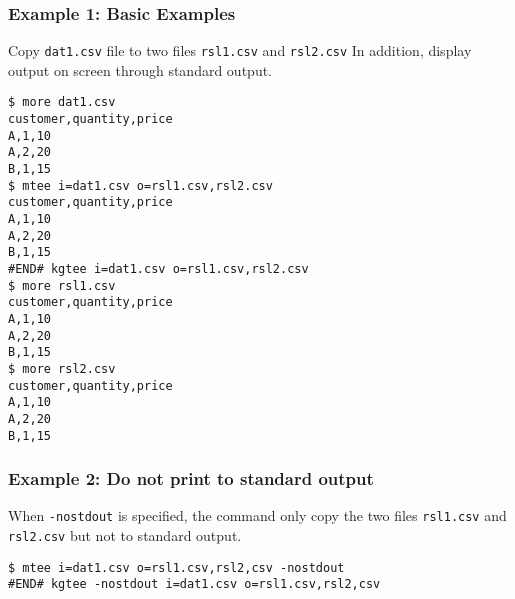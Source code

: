 \subsubsection*{Example 1: Basic Examples}

Copy \verb|dat1.csv| file to two files \verb|rsl1.csv| and \verb|rsl2.csv| In addition, display output on screen through standard output.


\begin{Verbatim}[baselinestretch=0.7,frame=single]
$ more dat1.csv
customer,quantity,price
A,1,10
A,2,20
B,1,15
$ mtee i=dat1.csv o=rsl1.csv,rsl2.csv
customer,quantity,price
A,1,10
A,2,20
B,1,15
#END# kgtee i=dat1.csv o=rsl1.csv,rsl2.csv
$ more rsl1.csv
customer,quantity,price
A,1,10
A,2,20
B,1,15
$ more rsl2.csv
customer,quantity,price
A,1,10
A,2,20
B,1,15
\end{Verbatim}
\subsubsection*{Example 2: Do not print to standard output }

When \verb|-nostdout| is specified, the command only copy the two files \verb|rsl1.csv| and \verb|rsl2.csv| but not to standard output.


\begin{Verbatim}[baselinestretch=0.7,frame=single]
$ mtee i=dat1.csv o=rsl1.csv,rsl2,csv -nostdout
#END# kgtee -nostdout i=dat1.csv o=rsl1.csv,rsl2,csv
\end{Verbatim}
